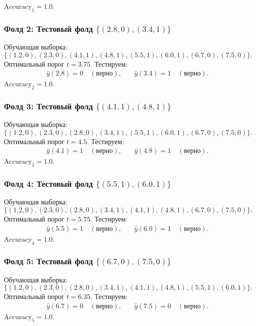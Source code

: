 \(\text{Accuracy}_1 = 1.0\).

\subsubsection*{Фолд 2: Тестовый фолд \(\{(2.8, 0), (3.4, 1)\}\)}
Обучающая выборка:
\[
    \{(1.2, 0), (2.3, 0), (4.1, 1), (4.8, 1), (5.5, 1), (6.0, 1), (6.7, 0), (7.5, 0)\}.
\]
Оптимальный порог \( t = 3.75 \). Тестируем:
\[
    \begin{aligned}
        \hat{y}(2.8) = 0 \quad (\text{верно}), & \quad \hat{y}(3.4) = 1 \quad (\text{верно}).
    \end{aligned}
\]
\(\text{Accuracy}_2 = 1.0\).

\subsubsection*{Фолд 3: Тестовый фолд \(\{(4.1, 1), (4.8, 1)\}\)}
Обучающая выборка:
\[
    \{(1.2, 0), (2.3, 0), (2.8, 0), (3.4, 1), (5.5, 1), (6.0, 1), (6.7, 0), (7.5, 0)\}.
\]
Оптимальный порог \( t = 4.5 \). Тестируем:
\[
    \begin{aligned}
        \hat{y}(4.1) = 1 \quad (\text{верно}), & \quad \hat{y}(4.8) = 1 \quad (\text{верно}).
    \end{aligned}
\]
\(\text{Accuracy}_3 = 1.0\).

\subsubsection*{Фолд 4: Тестовый фолд \(\{(5.5, 1), (6.0, 1)\}\)}
Обучающая выборка:
\[
    \{(1.2, 0), (2.3, 0), (2.8, 0), (3.4, 1), (4.1, 1), (4.8, 1), (6.7, 0), (7.5, 0)\}.
\]
Оптимальный порог \( t = 5.75 \). Тестируем:
\[
    \begin{aligned}
        \hat{y}(5.5) = 1 \quad (\text{верно}), & \quad \hat{y}(6.0) = 1 \quad (\text{верно}).
    \end{aligned}
\]
\(\text{Accuracy}_4 = 1.0\).

\subsubsection*{Фолд 5: Тестовый фолд \(\{(6.7, 0), (7.5, 0)\}\)}
Обучающая выборка:
\[
    \{(1.2, 0), (2.3, 0), (2.8, 0), (3.4, 1), (4.1, 1), (4.8, 1), (5.5, 1), (6.0, 1)\}.
\]
Оптимальный порог \( t = 6.35 \). Тестируем:
\[
    \begin{aligned}
        \hat{y}(6.7) = 0 \quad (\text{верно}), & \quad \hat{y}(7.5) = 0 \quad (\text{верно}).
    \end{aligned}
\]
\(\text{Accuracy}_5 = 1.0\).

